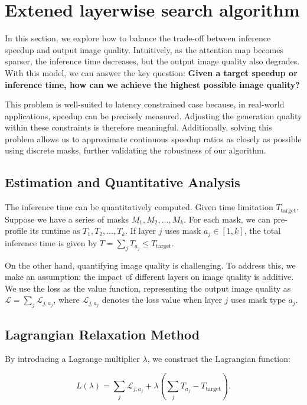\appendix

\section{Extened layerwise search algorithm}
\label{appendix:search}
In this section, we explore how to balance the trade-off between inference speedup and output image quality. Intuitively, as the attention map becomes sparser, the inference time decreases, but the output image quality also degrades. With this model, we can answer the key question: \textbf{Given a target speedup or inference time, how can we achieve the highest possible image quality?} 

This problem is well-suited to latency constrained case because, in real-world applications, speedup can be precisely measured. Adjusting the generation quality within these constraints is therefore meaningful. Additionally, solving this problem allows us to approximate continuous speedup ratios as closely as possible using discrete masks, further validating the robustness of our algorithm.

\subsection{Estimation and Quantitative Analysis} 
The inference time can be quantitatively computed. Given time limitation $T_{\text{target}}$. Suppose we have a series of masks $M_1, M_2, \ldots, M_k$. For each mask, we can pre-profile its runtime as $T_1, T_2, \ldots, T_k$. If layer $j$ uses mask $a_j \in [1, k]$, the total inference time is given by $T = \sum_{j} T_{a_j} \le T_{\text{target}}$.

On the other hand, quantifying image quality is challenging. To address this, we make an assumption: the impact of different layers on image quality is additive. We use the loss as the value function, representing the output image quality as $\mathcal{L} = \sum_{j} \mathcal{L}_{j, a_j}$, where $\mathcal{L}_{j, a_j}$ denotes the loss value when layer $j$ uses mask type $a_j$.

\subsection{Lagrangian Relaxation Method}

By introducing a Lagrange multiplier $\lambda$, we construct the Lagrangian function:

\begin{equation}
L(\lambda) = \sum_j \mathcal{L}_{j,a_j} + \lambda \left( \sum_j T_{a_j} - T_{\text{target}} \right).
\end{equation}


